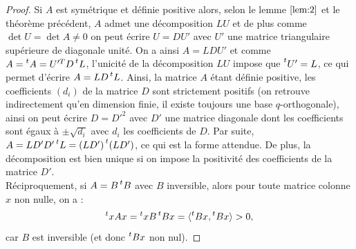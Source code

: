 \begin{proof}
Si $A$ est symétrique et définie positive alors, selon le lemme $\ref{lem:2}$ et le théorème précédent, $A$ admet une décomposition
$LU$ et de plus comme $\det{U} = \det{A} \neq 0$ on peut écrire $U = D U'$ avec $U'$ une matrice triangulaire supérieure 
de diagonale unité. On a ainsi $A=LDU'$ et comme $A=\prescript{t}{}{A}=U'^{T}D\prescript{t}{}{L}$, l'unicité de la décomposition $LU$ impose que 
$\prescript{t}{}{U'} = L$, ce qui permet d'écrire $A=LD\prescript{t}{}{L}$. 
Ainsi, la matrice $A$ étant définie positive, les coefficients $(d_i)$ de la matrice $D$ sont strictement positifs (on retrouve indirectement
qu'en dimension finie, il existe toujours une base $q$-orthogonale), 
ainsi on peut écrire $D = D'^2$ avec $D'$ une matrice diagonale dont les coefficients sont égaux à 
$\pm \sqrt{d_i}$ avec $d_i$ les coefficients de $D$. Par suite, $A=LD'D'\prescript{t}{}{L} = (LD')\prescript{t}{}{(LD')}$, ce qui est la forme attendue. 
De plus, la décomposition est bien unique si on impose la positivité des coefficients de la matrice $D'$. \\

Réciproquement, si $A=B \prescript{t}{}{B}$ avec $B$ inversible, alors pour toute matrice colonne $x$ non nulle, on a :
\[ \prescript{t}{}{x} A x = \prescript{t}{}{x} B \prescript{t}{}{B} x = \langle\prescript{t}{}{B} x, \prescript{t}{}{B} x\rangle > 0, \]
car $B$ est inversible (et donc $\prescript{t}{}{B} x$ non nul).
\end{proof}


